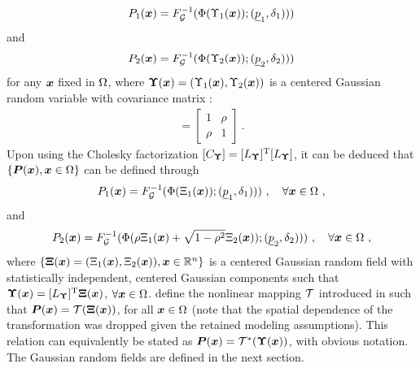 \begin{align}
  P_1(\boldsymbol{x}) = F_\mathcal{G}^{-1}(\Phi(\Upsilon_1(\boldsymbol{x})); (\underline{p}_1,\delta_{1})))
\end{align}
and
\begin{align}
  P_2(\boldsymbol{x}) = F_\mathcal{G}^{-1}(\Phi(\Upsilon_2(\boldsymbol{x})); (\underline{p}_2,\delta_{2})))
\end{align}
for any $\boldsymbol{x}$ fixed in $\Omega$, where $\boldsymbol{\Upsilon}(\boldsymbol{x}) = (\Upsilon_1(\boldsymbol{x}),\Upsilon_2(\boldsymbol{x}))$ is a centered Gaussian random variable with covariance matrix \cite{Moran1969}:
\begin{align}
  [C_{\bs{\Upsilon}}] =
  \begin{bmatrix}
    1    & \rho \\
    \rho & 1
  \end{bmatrix}~.
\end{align}
Upon using the Cholesky factorization $[C_{\boldsymbol{\Upsilon}}] = [L_{\boldsymbol{\Upsilon}}]^\mathrm{T} [L_{\boldsymbol{\Upsilon}}]$, it can be deduced that $\{\boldsymbol{P}(\boldsymbol{x}), \boldsymbol{x} \in \Omega\}$ can be defined through
\begin{align}\label{eq: def-P1}
  P_1(\boldsymbol{x}) = F_\mathcal{G}^{-1}(\Phi(\Xi_1(\boldsymbol{x})); (\underline{p}_1,\delta_{1})))~, \quad \forall \boldsymbol{x} \in \Omega~,
\end{align}
and
\begin{align}\label{eq: def-P2}
  P_2(\boldsymbol{x}) = F_\mathcal{G}^{-1}(\Phi(\rho \Xi_1(\boldsymbol{x}) + \sqrt{1-\rho^2} \Xi_2(\boldsymbol{x})); (\underline{p}_2,\delta_{2})))~,\quad \forall \boldsymbol{x} \in \Omega~,
\end{align}
where $\{\boldsymbol{\Xi}(\boldsymbol{x})=(\Xi_1(\boldsymbol{x}),\Xi_2(\boldsymbol{x})), \boldsymbol{x} \in \mathbb{R}^n\}$ is a centered Gaussian random field with statistically independent, centered Gaussian components such that $\boldsymbol{\Upsilon}(\boldsymbol{x}) = [L_{\boldsymbol{\Upsilon}}]^\mathrm{T}\boldsymbol{\Xi}(\boldsymbol{x})$,
$\forall \boldsymbol{x} \in \Omega$.  define the nonlinear mapping $\mathcal{T}$ introduced in  such that $\boldsymbol{P}(\boldsymbol{x}) = \mathcal{T}(\boldsymbol{\Xi}(\boldsymbol{x}))$,
for all $\boldsymbol{x} \in \Omega$ (note that the spatial dependence of the transformation was dropped given the retained modeling assumptions). This relation can equivalently be stated as $\boldsymbol{P}(\boldsymbol{x}) = \mathcal{T}^\ast(\boldsymbol{\Upsilon}(\boldsymbol{x}))$, with obvious notation. The Gaussian random fields are defined in the next section.

